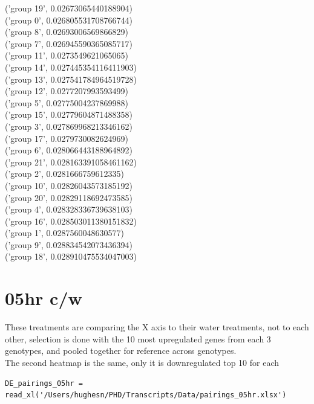 \documentclass[11pt]{article}
\begin{document}
('group 19', 0.02673065440188904)\\
('group 0', 0.026805531708766744)\\
('group 8', 0.02693006569866829)\\
('group 7', 0.026945590365085717)\\
('group 11', 0.0273549621065065)\\
('group 14', 0.027445354116411903)\\
('group 13', 0.027541784964519728)\\
('group 12', 0.0277207993593499)\\
('group 5', 0.02775004237869988)\\
('group 15', 0.02779604871488358)\\
('group 3', 0.027869968213346162)\\
('group 17', 0.0279730082624969)\\
('group 6', 0.028066443188964892)\\
('group 21', 0.028163391058461162)\\
('group 2', 0.0281666759612335)\\
('group 10', 0.02826043573185192)\\
('group 20', 0.02829118692473585)\\
('group 4', 0.028328336739638103)\\
('group 16', 0.028503011380151832)\\
('group 1', 0.0287560048630577)\\
('group 9', 0.028834542073436394)\\
('group 18', 0.028910475534047003)\\
\section{05hr c/w}
\label{sec:org5992d56}

These treatments are comparing the X axis to their water treatments, not to each other, selection is done with the 10 most upregulated genes from each 3 genotypes, and pooled together for reference across genotypes.\\
 The second heatmap is the same, only it is downregulated top 10 for each\\

\begin{verbatim}
DE_pairings_05hr = read_xl('/Users/hughesn/PHD/Transcripts/Data/pairings_05hr.xlsx')
\end{verbatim}
\end{document}
